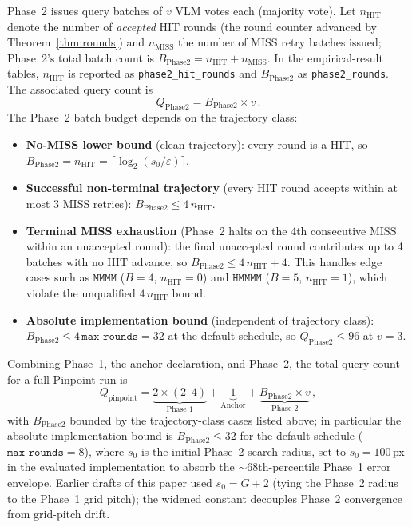 \documentclass[sigconf,nonacm]{acmart}
\begin{document}
Phase~2 issues query batches of $v$ VLM votes each (majority vote).
Let $n_{\text{HIT}}$ denote the number of \emph{accepted} HIT rounds
(the round counter advanced by Theorem~\ref{thm:rounds}) and
$n_{\text{MISS}}$ the number of MISS retry batches issued; Phase~2's
total batch count is
$B_{\text{Phase2}} = n_{\text{HIT}} + n_{\text{MISS}}$.  In the
empirical-result tables, $n_{\text{HIT}}$ is reported as
\texttt{phase2\_hit\_rounds} and $B_{\text{Phase2}}$ as
\texttt{phase2\_rounds}.  The associated query count is
\begin{equation}
  Q_{\text{Phase2}} = B_{\text{Phase2}} \times v\,.
  \label{eq:phase2-queries}
\end{equation}
The Phase~2 batch budget depends on the trajectory class:
\begin{itemize}
  \item \textbf{No-MISS lower bound} (clean trajectory): every round
    is a HIT, so $B_{\text{Phase2}} = n_{\text{HIT}}
    = \lceil \log_2(s_0/\varepsilon) \rceil$.
  \item \textbf{Successful non-terminal trajectory} (every HIT round
    accepts within at most 3 MISS retries):
    $B_{\text{Phase2}} \le 4\,n_{\text{HIT}}$.
  \item \textbf{Terminal MISS exhaustion} (Phase~2 halts on the 4th
    consecutive MISS within an unaccepted round): the final unaccepted
    round contributes up to 4 batches with no HIT advance, so
    $B_{\text{Phase2}} \le 4\,n_{\text{HIT}} + 4$.  This handles
    edge cases such as $\texttt{MMMM}$ ($B = 4$, $n_{\text{HIT}} = 0$)
    and $\texttt{HMMMM}$ ($B = 5$, $n_{\text{HIT}} = 1$), which violate
    the unqualified $4\,n_{\text{HIT}}$ bound.
  \item \textbf{Absolute implementation bound} (independent of
    trajectory class):
    $B_{\text{Phase2}} \le 4\,\texttt{max\_rounds} = 32$ at the default
    schedule, so $Q_{\text{Phase2}} \le 96$ at $v = 3$.
\end{itemize}

Combining Phase~1, the anchor declaration, and Phase~2, the total
query count for a full Pinpoint run is
\begin{equation}
  Q_{\text{pinpoint}}
    = \underbrace{2 \times (2\text{--}4)}_{\text{Phase 1}}
    + \underbrace{1}_{\text{Anchor}}
    + \underbrace{B_{\text{Phase2}} \times v}_{\text{Phase 2}}\,,
  \label{eq:total-queries}
\end{equation}
with $B_{\text{Phase2}}$ bounded by the trajectory-class cases listed
above; in particular the absolute implementation bound is
$B_{\text{Phase2}} \le 32$ for the default schedule
($\texttt{max\_rounds} = 8$),
where $s_0$ is the initial Phase~2 search radius, set to
$s_0 = 100$\,px in the evaluated implementation to absorb the
$\sim$$68$th-percentile Phase~1 error envelope.  Earlier drafts of
this paper used $s_0 = G + 2$ (tying the Phase~2 radius to the
Phase~1 grid pitch); the widened constant decouples Phase~2
convergence from grid-pitch drift.
\end{document}
